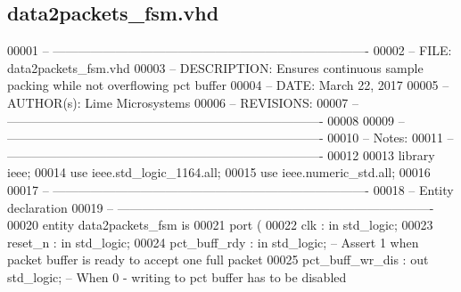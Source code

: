 \subsection{data2packets\+\_\+fsm.\+vhd}
\label{data2packets__fsm_8vhd_source}

\begin{DoxyCode}
00001 \textcolor{keyword}{-- ---------------------------------------------------------------------------- }
00002 \textcolor{keyword}{-- FILE:    data2packets\_fsm.vhd}
00003 \textcolor{keyword}{-- DESCRIPTION: Ensures continuous sample packing while not overflowing pct buffer  }
00004 \textcolor{keyword}{-- DATE:    March 22, 2017}
00005 \textcolor{keyword}{-- AUTHOR(s):   Lime Microsystems}
00006 \textcolor{keyword}{-- REVISIONS:}
00007 \textcolor{keyword}{-- ---------------------------------------------------------------------------- }
00008 
00009 \textcolor{keyword}{-- ----------------------------------------------------------------------------}
00010 \textcolor{keyword}{-- Notes:}
00011 \textcolor{keyword}{-- ----------------------------------------------------------------------------}
00012 
00013 \textcolor{vhdlkeyword}{library }\textcolor{keywordflow}{ieee};
00014 \textcolor{vhdlkeyword}{use }ieee.std\_logic\_1164.\textcolor{keywordflow}{all};
00015 \textcolor{vhdlkeyword}{use }ieee.numeric\_std.\textcolor{keywordflow}{all};
00016 
00017 \textcolor{keyword}{-- ----------------------------------------------------------------------------}
00018 \textcolor{keyword}{-- Entity declaration}
00019 \textcolor{keyword}{-- ----------------------------------------------------------------------------}
00020 \textcolor{keywordflow}{entity }data2packets_fsm \textcolor{keywordflow}{is}
00021    \textcolor{keywordflow}{port} \textcolor{vhdlchar}{(}
00022       \textcolor{vhdlchar}{clk}               \textcolor{vhdlchar}{:} \textcolor{keywordflow}{in} \textcolor{comment}{std\_logic};
00023       \textcolor{vhdlchar}{reset_n}           \textcolor{vhdlchar}{:} \textcolor{keywordflow}{in} \textcolor{comment}{std\_logic};
00024       \textcolor{vhdlchar}{pct_buff_rdy}      \textcolor{vhdlchar}{:} \textcolor{keywordflow}{in} \textcolor{comment}{std\_logic};\textcolor{keyword}{   -- Assert 1 when packet buffer is ready to accept one full packet}
00025       \textcolor{vhdlchar}{pct_buff_wr_dis}   \textcolor{vhdlchar}{:} \textcolor{keywordflow}{out} \textcolor{comment}{std\_logic};\textcolor{keyword}{  -- When 0  - writing to pct buffer has to be disabled}

\end{DoxyCode}
